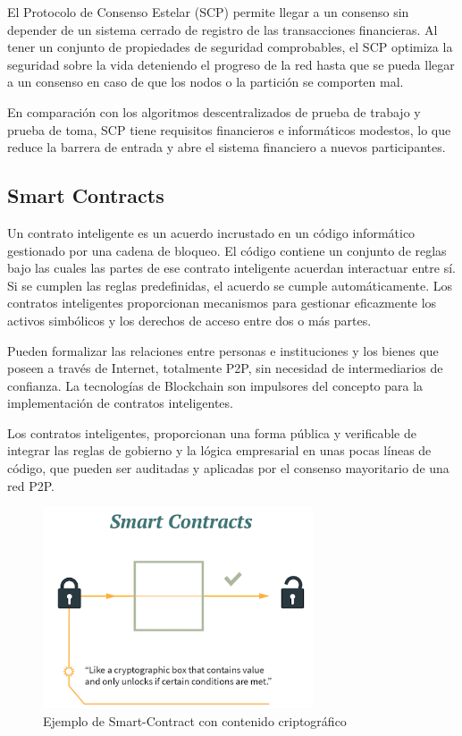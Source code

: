 \vspace{5mm}

\noindent El Protocolo de Consenso Estelar (SCP) permite llegar a un consenso sin depender de un sistema cerrado de 
registro de las transacciones financieras. Al tener un conjunto de propiedades de seguridad comprobables, el SCP 
optimiza la seguridad sobre la vida deteniendo el progreso de la red hasta que se pueda llegar a un consenso en 
caso de que los nodos o la partición se comporten mal.

\vspace{5mm}

\noindent En comparación con los algoritmos descentralizados de prueba de trabajo y prueba de toma, SCP tiene 
requisitos financieros e informáticos modestos, lo que reduce la barrera de entrada y abre el sistema financiero a 
nuevos participantes.

\subsection{Smart Contracts}

Un contrato inteligente es un acuerdo incrustado en un código informático gestionado por una cadena de bloqueo. El 
código contiene un conjunto de reglas bajo las cuales las partes de ese contrato inteligente acuerdan interactuar entre 
sí. Si se cumplen las reglas predefinidas, el acuerdo se cumple automáticamente. Los contratos inteligentes proporcionan 
mecanismos para gestionar eficazmente los activos simbólicos y los derechos de acceso entre dos o más partes. 

\vspace{5mm}

\noindent Pueden formalizar las relaciones entre personas e instituciones y los bienes que poseen a través de Internet, 
totalmente P2P, sin necesidad de intermediarios de confianza. La tecnologías de Blockchain son impulsores del concepto 
para la implementación de contratos inteligentes.

\vspace{5mm}

\noindent Los contratos inteligentes, proporcionan una forma pública y verificable de integrar las reglas de gobierno y 
la lógica empresarial en unas pocas líneas de código, que pueden ser auditadas y aplicadas por el consenso mayoritario 
de una red P2P.

\begin{figure}[ht!]
    \centering
    \includegraphics[width=8cm]{imagenes/herramientas/smart-contracts}
    \caption{Ejemplo de Smart-Contract con contenido criptográfico}
\end{figure}


